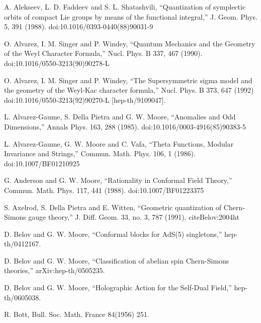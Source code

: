 \begin{enumerate}[label={[\arabic*]},leftmargin=3.2em,itemsep=2pt,topsep=4pt]

\item A. Alekseev, L. D. Faddeev and S. L. Shatashvili, “Quantization of symplectic orbits of compact Lie groups by means of the functional integral,” J. Geom. Phys. 5, 391 (1988). doi:10.1016/0393-0440(88)90031-9

\item O. Alvarez, I. M. Singer and P. Windey, “Quantum Mechanics and the Geometry of the Weyl Character Formula,” Nucl. Phys. B 337, 467 (1990). doi:10.1016/0550-3213(90)90278-L

\item O. Alvarez, I. M. Singer and P. Windey, “The Supersymmetric sigma model and the geometry of the Weyl-Kac character formula,” Nucl. Phys. B 373, 647 (1992) doi:10.1016/0550-3213(92)90270-L [hep-th/9109047].

\item L. Alvarez-Gaume, S. Della Pietra and G. W. Moore, “Anomalies and Odd Dimensions,” Annals Phys. 163, 288 (1985). doi:10.1016/0003-4916(85)90383-5

\item L. Alvarez-Gaume, G. W. Moore and C. Vafa, “Theta Functions, Modular Invariance and Strings,” Commun. Math. Phys. 106, 1 (1986). doi:10.1007/BF01210925

\item G. Anderson and G. W. Moore, “Rationality in Conformal Field Theory,” Commun. Math. Phys. 117, 441 (1988). doi:10.1007/BF01223375

\item S. Axelrod, S. Della Pietra and E. Witten, “Geometric quantization of Chern-Simons gauge theory,” J. Diff. Geom. 33, no. 3, 787 (1991). citeBelov:2004ht

\item D. Belov and G. W. Moore, “Conformal blocks for AdS(5) singletons,” hep-th/0412167.

\item D. Belov and G. W. Moore, “Classification of abelian spin Chern-Simons theories,” arXiv:hep-th/0505235.

\item D. Belov and G. W. Moore, “Holographic Action for the Self-Dual Field,” hep-th/0605038.

\item R. Bott, Bull. Soc. Math. France 84(1956) 251.


\end{enumerate}
